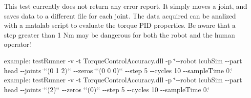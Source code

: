 This test currently does not return any error report. It simply moves a joint, and saves data to a different file for each joint. The data acquired can be analized with a matalab script to evaluate the torque P\+ID properties. Be aware that a step greater than 1 Nm may be dangerous for both the robot and the human operator!

example\+: test\+Runner -\/v -\/t Torque\+Control\+Accuracy.\+dll -\/p \char`\"{}-\/-\/robot icub\+Sim -\/-\/part head -\/-\/joints \char`\"{}\char`\"{}(0 1 2)\char`\"{}\char`\"{} -\/-\/zeros \char`\"{}\char`\"{}(0 0 0)\char`\"{}\char`\"{}  -\/-\/step 5  -\/-\/cycles 10 -\/-\/sample\+Time 0.\char`\"{} example\+: test\+Runner -\/v -\/t Torque\+Control\+Accuracy.\+dll -\/p \char`\"{}-\/-\/robot icub\+Sim -\/-\/part head -\/-\/joints \char`\"{}\char`\"{}(2)\char`\"{}\char`\"{} -\/-\/zeros \char`\"{}\char`\"{}(0)\char`\"{}\char`\"{} -\/-\/step 5 -\/-\/cycles 10 -\/-\/sample\+Time 0.\char`\"{}

